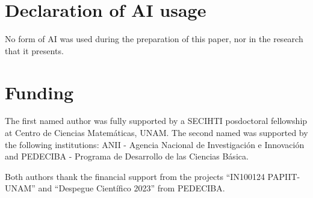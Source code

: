 \documentclass[10pt,reqno]{amsart}
\numberwithin{equation}{section}
\theoremstyle{remark}
\begin{document}
 

\section*{Declaration of AI usage}

No form of AI was used during the preparation of this paper, nor in the research that it presents. 



\section*{Funding}

The first named author was fully supported by a SECIHTI posdoctoral fellowship at Centro de Ciencias Matem\'aticas, UNAM. The second named was supported by the following institutions:  ANII - Agencia Nacional de Investigación e Innovación and PEDECIBA - Programa de Desarrollo de las Ciencias Básica. 

Both authors thank the financial support from the  projects “IN100124 PAPIIT-UNAM” and “Despegue Cient\'ifico 2023” from PEDECIBA. \\






\end{document}
